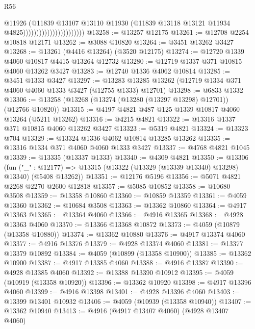 \begin{lexlean}{R56}
\begin{coremodule}
                                              @11926
                                              (@11839
                                                @13107
                                                @13110
                                                @11930
                                                (@11839
                                                  @13118
                                                  @13121
                                                  @11934
                                                  @4825)))))))))))))))))))))))
@13258 := @13257 @12175
@13261 := @12708 @2254 @10818 @12171
@13262 := @3088 @10820
@13264 := @3451 @13262 @3427
@13268 := @13261 (@4416 @13264) (@3520 @12175)
@13274 := @12720 @1339 @4060 @10817 @4415 @13264 @12732
@13280 := @12719 @1337 @371 @10815 @4060 @13262 @3427
@13283 := @12740 @1336 @4062 @10814
@13285 := @3451 @1333 @3427
@13297 := @13283 @13285 @13262 (@12719 @1334 @371 @4060 @4060 @1333 @3427 (@12755 @1333) @12701)
@13298 := @6833 @1332
@13306 := @13258 (@13268 (@13274 (@13280 (@13297 @13298) @12701)) (@12766 @10820))
@13315 := @4197 @4821 @487 @125 @1339 @10817 @4060 @13264 (@5211 @13262)
@13316 := @4215 @4821
@13322 := @13316 @1337 @371 @10815 @4060 @13262 @3427
@13323 := @5319 @4821
@13324 := @13323 @704
@13329 := @13324 @1336 @4062 @10814 @13285 @13262
@13335 := @13316 @1334 @371 @4060 @4060 @1333 @3427
@13337 := @4768 @4821 @1045
@13339 := @13335 (@13337 @1333)
@13340 := @4309 @4821
@13350 := @13306
    (fun ("_" : @12177) => @13315 (@13322 (@13329 (@13339 @13340) @13298) @13340) (@5408 @13262))
@13351 := @12176 @5196
@13356 := @5071 @4821 @2268 @2270 @2600 @12818
@13357 := @5085 @10852
@13358 := @10680 @3508
@13359 := @13358 @10860
@13360 := @10859 @13359
@13361 := @4059 @13360
@13362 := @10684 @3508
@13363 := @13362 @10860
@13364 := @4917 @13363
@13365 := @13364 @4060
@13366 := @4916 @13365
@13368 := @4928 @13363 @4060
@13370 := @13366 @13368 @10872
@13373 := @4059 (@10879 (@13358 @10880))
@13374 := @13362 @10880
@13376 := @4917 @13374 @4060
@13377 := @4916 @13376
@13379 := @4928 @13374 @4060
@13381 := @13377 @13379 @10892
@13384 := @4059 (@10899 (@13358 @10900))
@13385 := @13362 @10900
@13387 := @4917 @13385 @4060
@13388 := @4916 @13387
@13390 := @4928 @13385 @4060
@13392 := @13388 @13390 @10912
@13395 := @4059 (@10919 (@13358 @10920))
@13396 := @13362 @10920
@13398 := @4917 @13396 @4060
@13399 := @4916 @13398
@13401 := @4928 @13396 @4060
@13403 := @13399 @13401 @10932
@13406 := @4059 (@10939 (@13358 @10940))
@13407 := @13362 @10940
@13413 := @4916 (@4917 @13407 @4060) (@4928 @13407 @4060)

\end{coremodule}
\end{lexlean}
